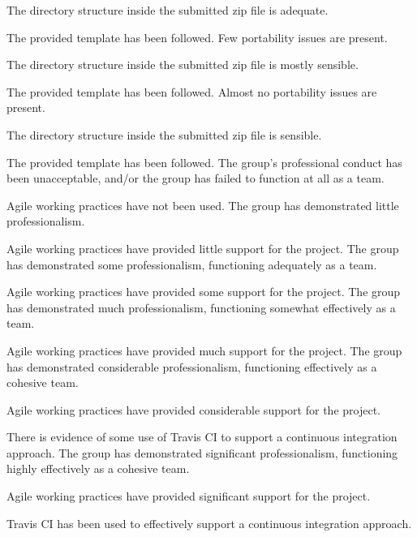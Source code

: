 \documentclass{../fal_assignment}
\begin{document}
\begin{markingrubric}
            \par The directory structure inside the submitted zip file is adequate.
            \par The provided template has been followed.
        \grade Few portability issues are present.
            \par The directory structure inside the submitted zip file is mostly sensible.
            \par The provided template has been followed.
        \grade Almost no portability issues are present.
            \par The directory structure inside the submitted zip file is sensible.
            \par The provided template has been followed.
%
        \grade\fail The group's professional conduct has been unacceptable,
            and/or the group has failed to function at all as a team.
            \par Agile working practices have not been used.
        \grade The group has demonstrated little professionalism.
            \par Agile working practices have provided little support for the project.
        \grade The group has demonstrated some professionalism,
            functioning adequately as a team.
            \par Agile working practices have provided some support for the project.
        \grade The group has demonstrated much professionalism,
            functioning somewhat effectively as a team.
            \par Agile working practices have provided much support for the project.
        \grade The group has demonstrated considerable professionalism,
            functioning effectively as a cohesive team.
            \par Agile working practices have provided considerable support for the project.
            \par There is evidence of some use of Travis CI to support a continuous integration approach.
        \grade The group has demonstrated significant professionalism,
            functioning highly effectively as a cohesive team.
            \par Agile working practices have provided significant support for the project.
            \par Travis CI has been used to effectively support a continuous integration approach.
%

\end{markingrubric}
\end{document}
